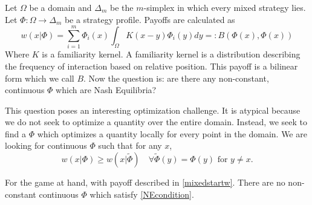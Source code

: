 \documentclass[]{article}
\begin{document}
			Let $\Omega$ be a domain and $\Delta_m$ be the $m$-simplex in which every mixed strategy lies. Let $\Phi:\Omega \rightarrow\Delta_m$ be a strategy profile. Payoffs are calculated as 
			\begin{equation}\label{mixedstartw}
				w(x|\Phi)=\sum_{i=1}^m \Phi_i(x)\int_\Omega K(x-y)\Phi_i(y)dy =:B(\Phi(x),\Phi(x)) 
			\end{equation} 
			Where $K$ is a familiarity kernel. A familiarity kernel is a distribution describing the frequency of interaction based on relative position. This payoff is a bilinear form which we call $B$. Now the question is: are there any non-constant, continuous $\Phi$ which are Nash Equilibria? 

			This question poses an interesting optimization challenge. It is atypical because we do not seek to optimize a quantity over the entire domain. Instead, we seek to find a $\Phi$ which optimizes a quantity locally for every point in the domain. We are looking for continuous $\Phi$ such that for any $x$,
			\begin{equation}\label{NEcondition}
				w(x|\Phi)\geq w(x|\tilde\Phi)\quad \forall \tilde \Phi(y) = \Phi (y) \text{ for } y\neq x.
			\end{equation}
		
		For the game at hand, with payoff described in \eqref{mixedstartw}. There are no non-constant continuous $\Phi$ which satisfy \eqref{NEcondition}.  
	
\end{document}
